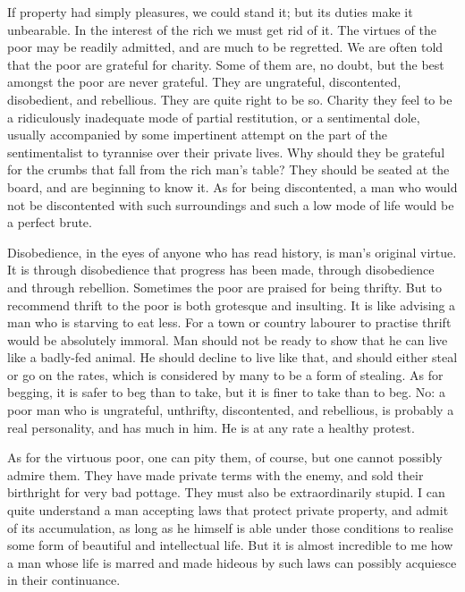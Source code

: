 If property had simply pleasures, we could stand it; but its duties make it unbearable. In the interest of the rich we must get rid of it. The virtues of the poor may be readily admitted, and are much to be regretted. We are often told that the poor are grateful for charity. Some of them are, no doubt, but the best amongst the poor are never grateful. They are ungrateful, discontented, disobedient, and rebellious. They are quite right to be so. Charity they feel to be a ridiculously inadequate mode of partial restitution, or a sentimental dole, usually accompanied by some impertinent attempt on the part of the sentimentalist to tyrannise over their private lives. Why should they be grateful for the crumbs that fall from the rich man’s table? They should be seated at the board, and are beginning to know it. As for being discontented, a man who would not be discontented with such surroundings and such a low mode of life would be a perfect brute.\par

Disobedience, in the eyes of anyone who has read history, is man’s original virtue. It is through disobedience that progress has been made, through disobedience and through rebellion. Sometimes the poor are praised for being thrifty. But to recommend thrift to the poor is both grotesque and insulting. It is like advising a man who is starving to eat less. For a town or country labourer to practise thrift would be absolutely immoral. Man should not be ready to show that he can live like a badly-fed animal. He should decline to live like that, and should either steal or go on the rates, which is considered by many to be a form of stealing. As for begging, it is safer to beg than to take, but it is finer to take than to beg. No: a poor man who is ungrateful, unthrifty, discontented, and rebellious, is probably a real personality, and has much in him. He is at any rate a healthy protest.\par

As for the virtuous poor, one can pity them, of course, but one cannot possibly admire them. They have made private terms with the enemy, and sold their birthright for very bad pottage. They must also be extraordinarily stupid. I can quite understand a man accepting laws that protect private property, and admit of its accumulation, as long as he himself is able under those conditions to realise some form of beautiful and intellectual life. But it is almost incredible to me how a man whose life is marred and made hideous by such laws can possibly acquiesce in their continuance.\par

